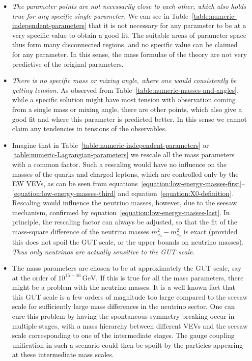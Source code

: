 \documentclass[a4paper,12pt]{article}
\begin{document}
\begin{itemize}
\item \textit{The parameter points are not necessarily close to each other, which also holds true for any specific single parameter.} We can see in Table~\ref{table:numeric-independent-parameters} that it is not necessary for any parameter to be at a very specific value to obtain a good fit. The suitable areas of parameter space thus form many disconnected regions, and no specific value can be claimed for any parameter. In this sense, the mass formulae of the theory are not very predictive of the original parameters.
\item \textit{There is no specific mass or mixing angle, where one would consistently be getting tension.} As observed from Table~\ref{table:numeric-masses-and-angles}, while a specific solution might have most tension with observation coming from a single mass or mixing angle, there are other points, which also give a good fit and where this parameter is predicted better. In this sense we cannot claim any tendencies in tensions of the observables.
\item Imagine that in Table~\ref{table:numeric-independent-parameters} or \ref{table:numeric-Lagrangian-parameters} we rescale all the mass parameters with a common factor. Such a rescaling would have no influence on the masses of the quarks and charged leptons, which are controlled only by the EW VEVs, as can be seen from equations~\eqref{equation:low-energy-masses-first}--\eqref{equation:low-energy-masses-third} and equation~\eqref{equation:X0-definition}. Rescaling would influence the neutrino masses, however, due to the seesaw mechanism, confirmed by equation~\eqref{equation:low-energy-masses-last}. In principle, the rescaling factor can always be adjusted, so that the fit of the mass-square difference of the neutrino masses $m_{\nu_3}^2-m_{\nu_2}^2$ is exact (provided this does not spoil the GUT scale, or the upper bounds on neutrino masses). \textit{Thus only neutrinos are actually sensitive to the GUT scale.}
\item The mass parameters are chosen to be at approximately the GUT scale, say at the order of $10^{15-16}\,\mathrm{GeV}$. If this is true for all the mass parameters, there might be a problem with the neutrino masses. It is a well known fact that this GUT scale is a few orders of magnitude too large compared to the seesaw scale for sufficiently large mass differences in the neutrino sector. One can cure this problem by having the spontaneous symmetry breaking occur in multiple stages, with a mass hierarchy between different VEVs and the seesaw scale corresponding to one of the intermediate stages. The gauge coupling unification in such a scenario could then be spoilt by the particles appearing at these intermediate mass scales.


\end{itemize}
\end{document}
